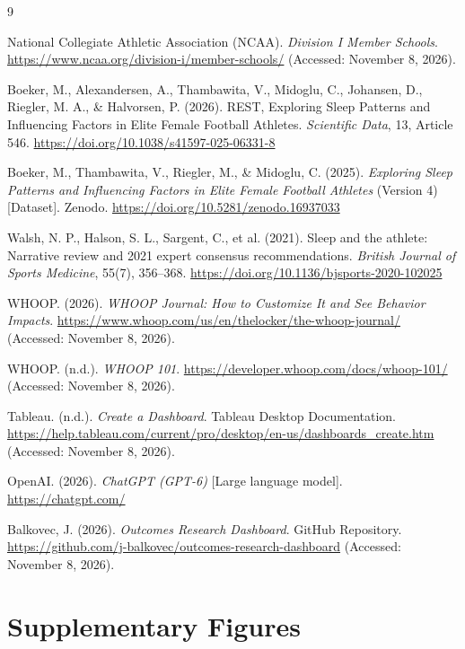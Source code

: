 \documentclass[11pt,a4paper]{article}
\begin{document}
\clearpage
\begin{thebibliography}{9}

National Collegiate Athletic Association (NCAA).
\textit{Division I Member Schools}.
\url{https://www.ncaa.org/division-i/member-schools/}
(Accessed: November 8, 2026).

Boeker, M., Alexandersen, A., Thambawita, V.,
Midoglu, C., Johansen, D., Riegler, M. A.,
\& Halvorsen, P. (2026).
REST, Exploring Sleep Patterns and Influencing
Factors in Elite Female Football Athletes.
\textit{Scientific Data}, 13, Article 546.
\url{https://doi.org/10.1038/s41597-025-06331-8}

Boeker, M., Thambawita, V., Riegler, M.,
\& Midoglu, C. (2025).
\textit{Exploring Sleep Patterns and Influencing
Factors in Elite Female Football Athletes}
(Version 4) [Dataset].
Zenodo.
\url{https://doi.org/10.5281/zenodo.16937033}

Walsh, N. P., Halson, S. L., Sargent, C.,
et al. (2021).
Sleep and the athlete: Narrative review and
2021 expert consensus recommendations.
\textit{British Journal of Sports Medicine},
55(7), 356--368.
\url{https://doi.org/10.1136/bjsports-2020-102025}

WHOOP. (2026).
\textit{WHOOP Journal: How to Customize It
and See Behavior Impacts}.
\url{https://www.whoop.com/us/en/thelocker/the-whoop-journal/}
(Accessed: November 8, 2026).

WHOOP. (n.d.).
\textit{WHOOP 101}.
\url{https://developer.whoop.com/docs/whoop-101/}
(Accessed: November 8, 2026).

Tableau. (n.d.).
\textit{Create a Dashboard}.
Tableau Desktop Documentation.
\url{https://help.tableau.com/current/pro/desktop/en-us/dashboards_create.htm}
(Accessed: November 8, 2026).

OpenAI. (2026).
\textit{ChatGPT (GPT-6)} [Large language model].
\url{https://chatgpt.com/}

Balkovec, J. (2026).
\textit{Outcomes Research Dashboard}.
GitHub Repository.
\url{https://github.com/j-balkovec/outcomes-research-dashboard}
(Accessed: November 8, 2026).

\end{thebibliography}

\clearpage
\appendix
\section{Supplementary Figures}
\end{document}

